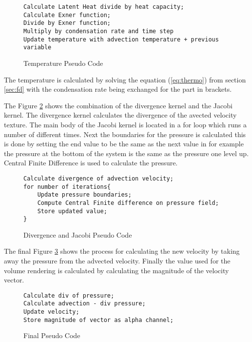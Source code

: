 \begin{figure}[h|]
\centering
\begin{lstlisting}
Calculate Latent Heat divide by heat capacity;
Calculate Exner function;
Divide by Exner function;
Multiply by condensation rate and time step
Update temperature with advection temperature + previous variable
\end{lstlisting}
\caption{Temperature Pseudo Code}
\label{sc:thermo}
\end{figure}

The temperature is calculated by solving the equation (\ref{eq:thermo}) from section \ref{sec:fd} with the condensation rate being exchanged for the part in brackets.

The Figure \ref{sc:div_jacobi} shows the combination of the divergence kernel and the Jacobi kernel.
The divergence kernel calculates the divergence of the avected velocity texture.
The main body of the Jacobi kernel is located in a for loop which runs a number of different times.
Next the boundaries for the pressure is calculated this is done by setting the end value to be the same as the next value in for example the pressure at the bottom of the system is the same as the pressure one level up.
Central Finite Difference is used to calculate the pressure.

\begin{figure}[h|]
\centering
\begin{lstlisting}
Calculate divergence of advection velocity;
for number of iterations{
	Update pressure boundaries;
	Compute Central Finite difference on pressure field;
	Store updated value;
}
\end{lstlisting}
\caption{Divergence and Jacobi Pseudo Code}
\label{sc:div_jacobi}
\end{figure}

The final Figure \ref{sc:cloud_pseudo} shows the process for calculating the new velocity by taking away the pressure from the advected velocity.
Finally the value used for the volume rendering is calculated by calculating the magnitude of the velocity vector.

\begin{figure}[h|]
\centering
\begin{lstlisting}
Calculate div of pressure;
Calculate advection - div pressure;
Update velocity;
Store magnitude of vector as alpha channel;
\end{lstlisting}
\caption{Final Pseudo Code}
\label{sc:cloud_pseudo}
\end{figure}
